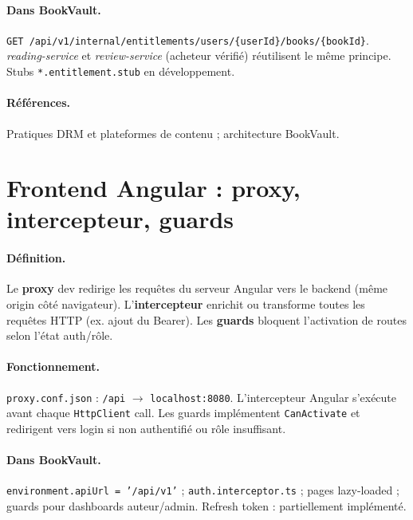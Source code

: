 \documentclass[12pt,a4paper]{report}
\begin{document}
\paragraph{Dans BookVault.} \texttt{GET /api/v1/internal/entitlements/users/\{userId\}/books/\{bookId\}}. \textit{reading-service} et \textit{review-service} (acheteur vérifié) réutilisent le même principe. Stubs \texttt{*.entitlement.stub} en développement.\par

\paragraph{Références.} Pratiques DRM et plateformes de contenu ; architecture BookVault.\par


\section{Frontend Angular : proxy, intercepteur, guards}

\paragraph{Définition.} Le \textbf{proxy} dev redirige les requêtes du serveur Angular vers le backend (même origin côté navigateur). L'\textbf{intercepteur} enrichit ou transforme toutes les requêtes HTTP (ex. ajout du Bearer). Les \textbf{guards} bloquent l'activation de routes selon l'état auth/rôle.\par

\paragraph{Fonctionnement.} \texttt{proxy.conf.json} : \texttt{/api} $\rightarrow$ \texttt{localhost:8080}. L'intercepteur Angular s'exécute avant chaque \texttt{HttpClient} call. Les guards implémentent \texttt{CanActivate} et redirigent vers login si non authentifié ou rôle insuffisant.\par

\paragraph{Dans BookVault.} \texttt{environment.apiUrl = '/api/v1'} ; \texttt{auth.interceptor.ts} ; pages lazy-loaded ; guards pour dashboards auteur/admin. Refresh token : partiellement implémenté.\par
\end{document}
